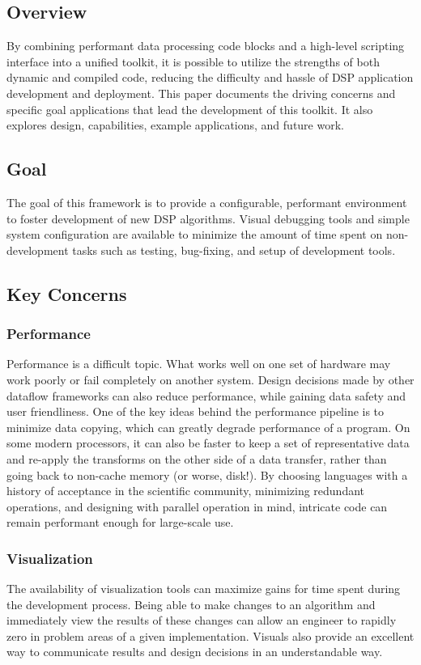 \documentclass[journal]{IEEEtran}
\begin{document}
\subsection{Overview}
By combining performant data processing code blocks and a high-level scripting interface into a unified toolkit, it 
is possible to utilize the strengths of both dynamic and compiled code, reducing the difficulty and hassle of DSP application 
development and deployment. This paper documents the driving concerns and specific goal applications that lead the development of this toolkit. 
It also explores design, capabilities, example applications, and future work. 

\subsection{Goal}
The goal of this framework is to provide a configurable, performant environment to foster development of new DSP algorithms. 
Visual debugging tools and simple system configuration are available to minimize the amount of time spent on non-development tasks
such as testing, bug-fixing, and setup of development tools.   

\subsection{Key Concerns}
\subsubsection{Performance}
Performance is a difficult topic. What works well on one set of hardware may work poorly or fail completely on another system. Design decisions
made by other dataflow frameworks can also reduce performance, while gaining data safety and user friendliness. One of the key ideas behind the 
performance pipeline is to minimize data copying, which can greatly degrade performance of a program. On some modern processors, it can also be 
faster to keep a set of representative data and re-apply the transforms on the other side of a data transfer, rather than going back to non-cache memory 
(or worse, disk!). By choosing languages with a history of acceptance in the scientific community, minimizing redundant operations, and designing 
with parallel operation in mind, intricate code can remain performant enough for large-scale use.

\subsubsection{Visualization}
The availability of visualization tools can maximize gains for time spent during the development process. Being able to make changes to an 
algorithm and immediately view the results of these changes can allow an engineer to rapidly zero in problem areas of a given implementation. 
Visuals also provide an excellent way to communicate results and design decisions in an understandable way.
\end{document}
